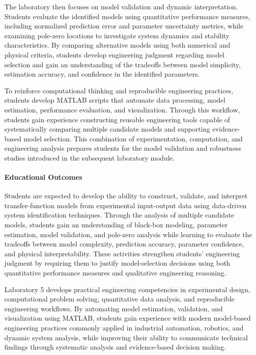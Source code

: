 \documentclass[journal]{IEEEtran}
\begin{document}
The laboratory then focuses on model validation and dynamic interpretation. Students evaluate the identified models using quantitative performance measures, including normalized prediction error and parameter uncertainty metrics, while examining pole-zero locations to investigate system dynamics and stability characteristics. By comparing alternative models using both numerical and physical criteria, students develop engineering judgment regarding model selection and gain an understanding of the tradeoffs between model simplicity, estimation accuracy, and confidence in the identified parameters.

To reinforce computational thinking and reproducible engineering practices, students develop MATLAB scripts that automate data processing, model estimation, performance evaluation, and visualization. Through this workflow, students gain experience constructing reusable engineering tools capable of systematically comparing multiple candidate models and supporting evidence-based model selection. This combination of experimentation, computation, and engineering analysis prepares students for the model validation and robustness studies introduced in the subsequent laboratory module.


\paragraph{Educational Outcomes}
Students are expected to develop the ability to construct, validate, and interpret transfer-function models from experimental input-output data using data-driven system identification techniques. Through the analysis of multiple candidate models, students gain an understanding of black-box modeling, parameter estimation, model validation, and pole-zero analysis while learning to evaluate the tradeoffs between model complexity, prediction accuracy, parameter confidence, and physical interpretability. These activities strengthen students' engineering judgment by requiring them to justify model-selection decisions using both quantitative performance measures and qualitative engineering reasoning.


\medskip

Laboratory 5 develops practical engineering competencies in experimental design, computational problem solving, quantitative data analysis, and reproducible engineering workflows. By automating model estimation, validation, and visualization using MATLAB, students gain experience with modern model-based engineering practices commonly applied in industrial automation, robotics, and dynamic system analysis, while improving their ability to communicate technical findings through systematic analysis and evidence-based decision making.
\end{document}
